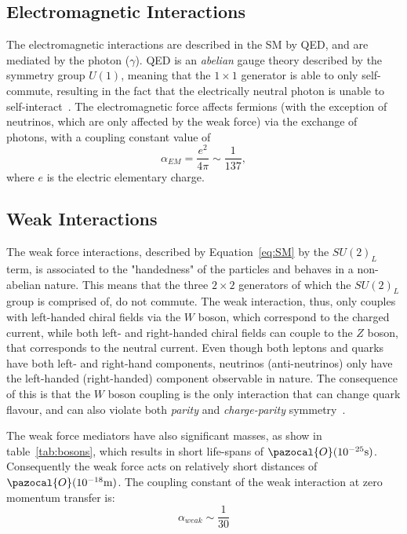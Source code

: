 	
	\subsection*{Electromagnetic Interactions}
	The electromagnetic interactions are described in the \ac{SM} by \ac{QED}, and are mediated by the photon ($\gamma$).
	\ac{QED} is an \textit{abelian} gauge theory described by the symmetry group $U(1)$, meaning that the $1\times1$ generator is able to only self-commute, resulting in the fact that the electrically neutral photon is unable to self-interact~\cite{Pich2012}. The electromagnetic force affects fermions (with the exception of neutrinos, which are only affected by the weak force) via the exchange of photons, with a coupling constant value of 
	\begin{equation}
	\alpha_{EM}=\frac{e^2}{4\pi}\sim\frac{1}{137},
	\end{equation}
	 where $e$ is the electric elementary charge.	
	\subsection*{Weak Interactions}
	The weak force interactions, described by Equation~\ref{eq:SM} by the $SU(2)_L$ term, is associated to the "handedness" of the particles and behaves in a non-abelian nature. This means that the three $2\times2$ generators of which the $SU(2)_L$ group is comprised of, do not commute.
	The weak interaction, thus, only couples with left-handed chiral fields via the $W$ boson, which correspond to the charged current, while both left- and right-handed chiral fields can couple to the $Z$ boson, that corresponds to the neutral current. 
	Even though both leptons and quarks have both left- and right-hand components, neutrinos (anti-neutrinos) only have the left-handed (right-handed) component observable in nature. 
	The consequence of this is that the $W$ boson coupling is the only interaction that can change quark flavour, and can also violate both \textit{parity} and \textit{charge-parity} symmetry~\cite{Weinberg:1996kr}.  
	
	The weak force mediators have also significant masses, as show in table~\ref{tab:bosons}, which results in short life-spans of $\pazocal{O}(10^{-25}\mathrm{s})$. Consequently the weak force acts on relatively short distances of $\pazocal{O}(10^{-18}\mathrm{m})$. The coupling constant of the weak interaction at zero momentum transfer is:
	\begin{equation}
	\alpha_{weak}\sim\frac{1}{30}
	\end{equation}
